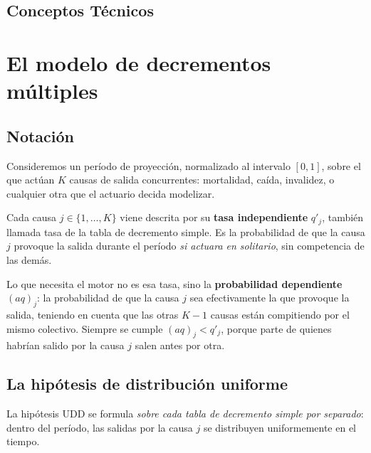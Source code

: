 \documentclass[a4paper, 12pt]{article}
\begin{document}
\subsection*{Conceptos Técnicos}
\noindent{}

\newpage

\tableofcontents

\newpage

\section{El modelo de decrementos múltiples}

\subsection{Notación}

Consideremos un período de proyección, normalizado al intervalo $[0,1]$, sobre el que actúan $K$ causas de salida concurrentes: mortalidad, caída, invalidez, o cualquier otra que el actuario decida modelizar.

Cada causa $j \in \{1,\dots,K\}$ viene descrita por su \textbf{tasa independiente} $q'_j$, también llamada tasa de la tabla de decremento simple. Es la probabilidad de que la causa $j$ provoque la salida durante el período \emph{si actuara en solitario}, sin competencia de las demás.

Lo que necesita el motor no es esa tasa, sino la \textbf{probabilidad dependiente} $(aq)_j$: la probabilidad de que la causa $j$ sea efectivamente la que provoque la salida, teniendo en cuenta que las otras $K-1$ causas están compitiendo por el mismo colectivo. Siempre se cumple $(aq)_j < q'_j$, porque parte de quienes habrían salido por la causa $j$ salen antes por otra.

\subsection{La hipótesis de distribución uniforme}

La hipótesis UDD se formula \emph{sobre cada tabla de decremento simple por separado}: dentro del período, las salidas por la causa $j$ se distribuyen uniformemente en el tiempo.
\end{document}
